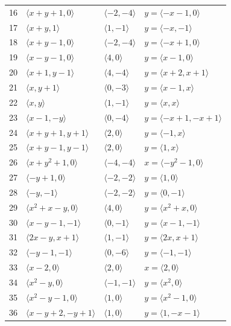 \documentclass[11pt]{article}
\begin{document}
\begin{longtable}{@{}rlll@{}}
16 & $\langle x+y+1,0\rangle$ & $\langle -2,-4\rangle$ & $y=\langle -x-1,0\rangle$\\
17 & $\langle x+y,1\rangle$ & $\langle 1,-1\rangle$ & $y=\langle -x,-1\rangle$\\
18 & $\langle x+y-1,0\rangle$ & $\langle -2,-4\rangle$ & $y=\langle -x+1,0\rangle$\\
19 & $\langle x-y-1,0\rangle$ & $\langle 4,0\rangle$ & $y=\langle x-1,0\rangle$\\
20 & $\langle x+1,y-1\rangle$ & $\langle 4,-4\rangle$ & $y=\langle x+2,x+1\rangle$\\
21 & $\langle x,y+1\rangle$ & $\langle 0,-3\rangle$ & $y=\langle x-1,x\rangle$\\
22 & $\langle x,y\rangle$ & $\langle 1,-1\rangle$ & $y=\langle x,x\rangle$\\
23 & $\langle x-1,-y\rangle$ & $\langle 0,-4\rangle$ & $y=\langle -x+1,-x+1\rangle$\\
24 & $\langle x+y+1,y+1\rangle$ & $\langle 2,0\rangle$ & $y=\langle -1,x\rangle$\\
25 & $\langle x+y-1,y-1\rangle$ & $\langle 2,0\rangle$ & $y=\langle 1,x\rangle$\\
26 & $\langle x+y^{2}+1,0\rangle$ & $\langle -4,-4\rangle$ & $x=\langle -y^{2}-1,0\rangle$\\
27 & $\langle -y+1,0\rangle$ & $\langle -2,-2\rangle$ & $y=\langle 1,0\rangle$\\
28 & $\langle -y,-1\rangle$ & $\langle -2,-2\rangle$ & $y=\langle 0,-1\rangle$\\
29 & $\langle x^{2}+x-y,0\rangle$ & $\langle 4,0\rangle$ & $y=\langle x^{2}+x,0\rangle$\\
30 & $\langle x-y-1,-1\rangle$ & $\langle 0,-1\rangle$ & $y=\langle x-1,-1\rangle$\\
31 & $\langle 2x-y,x+1\rangle$ & $\langle 1,-1\rangle$ & $y=\langle 2x,x+1\rangle$\\
32 & $\langle -y-1,-1\rangle$ & $\langle 0,-6\rangle$ & $y=\langle -1,-1\rangle$\\
33 & $\langle x-2,0\rangle$ & $\langle 2,0\rangle$ & $x=\langle 2,0\rangle$\\
34 & $\langle x^{2}-y,0\rangle$ & $\langle -1,-1\rangle$ & $y=\langle x^{2},0\rangle$\\
35 & $\langle x^{2}-y-1,0\rangle$ & $\langle 1,0\rangle$ & $y=\langle x^{2}-1,0\rangle$\\
36 & $\langle x-y+2,-y+1\rangle$ & $\langle 1,0\rangle$ & $y=\langle 1,-x-1\rangle$\\

\end{longtable}
\end{document}
